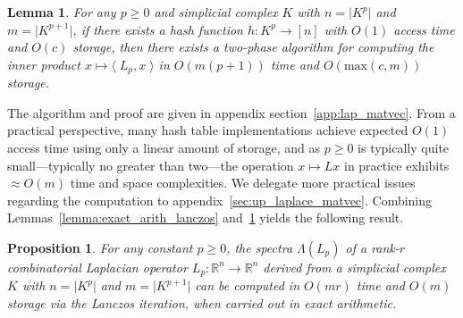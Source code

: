 \documentclass[10pt]{article}
\numberwithin{equation}{section}
\newcommand{\+}{%
	\raisebox{0.18ex}{\scaleobj{0.55}{+}}
}
\newtheorem{proposition}{Proposition}
\newtheorem{lemma}{Lemma}
\theoremstyle{definition}
\theoremstyle{definition}
\begin{document}
\begin{lemma}\label{lemma:matvec_lap}
	For any $p \geq 0$ and simplicial complex $K$ with $n = \lvert K^p \rvert$ and $m = \lvert K^{p+1} \rvert$, if there exists a hash function $h: K^p \to [n]$ with $O(1)$ access time and $O(c)$ storage, then there exists a two-phase algorithm for computing the inner product $x \mapsto \langle \; L_p, x	\; \rangle$ in $O(m(p+1))$ time and $O(\mathrm{max}(c,m))$ storage. 
\end{lemma}
\noindent The algorithm and proof are given in appendix section~\ref{app:lap_matvec}. From a practical perspective, many hash table implementations achieve expected $O(1)$ access time using only a linear amount of storage, and as $p \geq 0$ is typically quite small---typically no greater than two---the operation $x \mapsto L x$ in practice exhibits $\approx O(m)$ time and space complexities. 
We delegate more practical issues regarding the computation to appendix~\ref{sec:up_laplace_matvec}.
Combining Lemmas~\ref{lemma:exact_arith_lanczos} and~\ref{lemma:matvec_lap} yields the following result. 
\begin{proposition}\label{prop:spectral_rank_complexity}
For any constant $p \geq 0$, the spectra $\Lambda(L_p)$ of a rank-$r$ combinatorial Laplacian operator $L_p: \mathbb{R}^n \to \mathbb{R}^n$ derived from a simplicial complex $K$ with $n = \lvert K^p \rvert$ and $m = \lvert K^{p+1} \rvert$ can be computed in $O(mr)$ time and $O(m)$ storage via the Lanczos iteration, when carried out in exact arithmetic. 
\end{proposition}	
\end{document}
